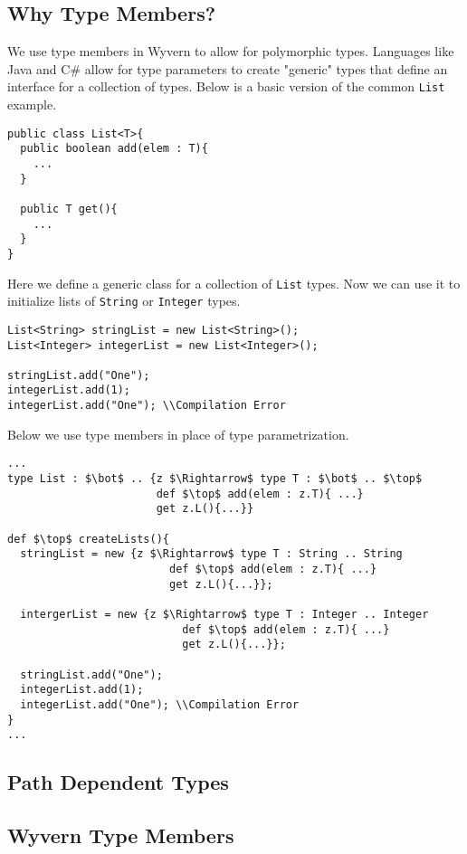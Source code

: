 \documentclass{llncs}
\begin{document}
\subsection{Why Type Members?}
We use type members in Wyvern to allow for polymorphic types. 
Languages like Java and C\# allow for type parameters to create 
"generic" types that define an interface for a collection of types. 
Below is a basic version of the common \texttt{List} example.
\begin{lstlisting}[mathescape, style=custom_lang]
public class List<T>{
  public boolean add(elem : T){
    ...
  }

  public T get(){
    ...
  }
}
\end{lstlisting}
Here we define a generic class for a collection of \texttt{List} 
types. Now we can use it to initialize lists of \texttt{String} or 
\texttt{Integer} types.
\begin{lstlisting}[mathescape, style=custom_lang]
List<String> stringList = new List<String>();
List<Integer> integerList = new List<Integer>();

stringList.add("One");
integerList.add(1);
integerList.add("One"); \\Compilation Error
\end{lstlisting}
Below we use type members in place of type parametrization. 
\begin{lstlisting}[mathescape, style=custom_lang]
...
type List : $\bot$ .. {z $\Rightarrow$ type T : $\bot$ .. $\top$
                       def $\top$ add(elem : z.T){ ...}
                       get z.L(){...}}

def $\top$ createLists(){
  stringList = new {z $\Rightarrow$ type T : String .. String
                         def $\top$ add(elem : z.T){ ...}
                         get z.L(){...}};

  intergerList = new {z $\Rightarrow$ type T : Integer .. Integer
                           def $\top$ add(elem : z.T){ ...}
                           get z.L(){...}};

  stringList.add("One");
  integerList.add(1);
  integerList.add("One"); \\Compilation Error
}
...
\end{lstlisting}


\subsection{Path Dependent Types}


\subsection{Wyvern Type Members}
\end{document}
